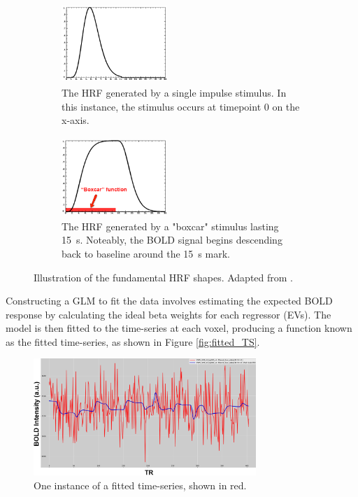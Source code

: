 \begin{figure}[htbp]
 	\centering
	\begin{subfigure}{0.49\textwidth}
		\centering
    		\includegraphics[width = 4cm, height = 3cm]{assets/images/single_HRF.jpg}
    		\caption{The \acrshort{HRF} generated by a single impulse stimulus. In this instance, the stimulus occurs at timepoint $ 0 $ on the x-axis.}
    		\label{fig:single_HRF}
	\end{subfigure}
	\hfill
	\begin{subfigure}{0.49\textwidth}
		\centering
   		\includegraphics[width = 4cm, height = 3cm]{assets/images/box_HRF.jpg}
   		\caption{The \acrshort{HRF} generated by a "boxcar" stimulus lasting \SI{15}{\second}. Noteably, the \gls{BOLD} signal begins descending back to baseline around the \SI{15}{\second} mark.}
   		\label{fig:box_HRF}
	\end{subfigure}
	\caption[Fundamental HRF Shapes]{Illustration of the fundamental \gls{HRF} shapes. Adapted from \cite{Andy_HRF}.}
 	\label{fig:HRFs}
\end{figure}

Constructing a \gls{GLM} to fit the data involves estimating the expected \gls{BOLD} response by calculating the ideal beta weights for each regressor (\gls{EV}s). The model is then fitted to the time-series at each voxel, producing a function known as the fitted time-series, as shown in Figure \autoref{fig:fitted_TS}.

\begin{figure}[htbp]
    \centering
    \includegraphics[width = 0.75\textwidth]{assets/images/fitted_and_preproc.png}
    \caption[Fitted Time-Series]{One instance of a fitted time-series, shown in red.}
    \label{fig:fitted_TS}
\end{figure}

